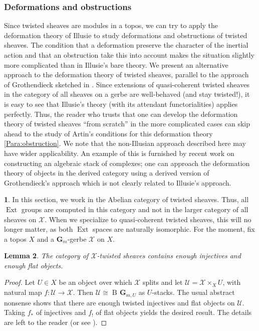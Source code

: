 \documentclass[11pt]{amsart}
\newcommand{\field}[1]{\mathbf #1}
\newcommand{\ms}[1]{\mathscr #1}
\newcommand{\G}{\field G} %
\DeclareMathOperator{\ext}{\operatorname{Ext}}
\renewcommand{\[}{[\!\hspace{0.03em}[}
\renewcommand{\]}{]\!\hspace{0.03em}]}
\renewcommand{\(}{(\!\hspace{0.03em}(}
\renewcommand{\)}{)\!\hspace{0.03em})}
\DeclareMathOperator{\B}{\operatorname{B\!}}
\newtheorem{lem}{Lemma}[subsubsection]%
\theoremstyle{definition}
\newtheorem{para}[lem]{\indent}
\theoremstyle{remark}
\begin{document}
\subsubsection{Deformations and obstructions}\label{S:deformations of twisted sheaves}
Since twisted sheaves are modules in a topos, we can try to apply the deformation theory of 
Illusie to study deformations and obstructions of twisted sheaves.  The condition that 
a deformation preserve the character of the inertial action and that an 
obstruction take this into account makes the situation slightly more 
complicated than in Illusie's bare theory.  We present an alternative 
approach 
to the deformation theory of twisted sheaves, parallel to the 
approach of Grothendieck sketched in \cite{illusie}.  Since extensions of quasi-coherent twisted sheaves in the 
category of all sheaves on a gerbe are well-behaved (and stay 
twisted!), it is easy to see that Illusie's theory (with its attendant 
functorialities) applies perfectly.  Thus, the reader who trusts that 
one can develop the deformation theory of twisted sheaves ``from 
scratch'' in the more complicated cases can skip ahead to the study 
of Artin's conditions for this deformation theory 
\ref{Para:obstruction}.  We note that the non-Illusian approach 
described here may have wider applicability.  An example of this is 
furnished by recent work \cite{moduli-complexes} on constructing an algebraic 
stack of complexes; one can approach the deformation theory of 
objects in the derived category using a derived version of 
Grothendieck's approach which is not clearly related to Illusie's 
approach.

\begin{para} In this 
section, we work in the Abelian category of twisted sheaves.  Thus, 
all $\ext$ groups are computed in this category and not in the larger 
category of all sheaves on $\ms X$.  When we specialize to 
quasi-coherent twisted sheaves, this will no longer matter, as both 
$\ext$ spaces are naturally isomorphic.  For the moment, fix a topos 
$X$ and a $\G_{m}$-gerbe $\ms X$ on $X$.
\end{para}
\begin{lem}\label{L:enough of everything} The category of $\ms X$-twisted sheaves contains enough 
injectives and enough flat objects.
\end{lem}
\begin{proof} Let $U\in X$ be an object over which $\ms X$ splits and 
let $\ms U=\ms X\times_{X}U$, with natural map $f:\ms U\to\ms X$.  
Then $\ms U\cong\B{\G_{m,U}}$ as $U$-stacks.  The usual abstract 
nonsense shows that there are enough twisted injectives and flat objects on $\ms 
U$.  Taking $f_{\ast}$ of injectives and $f_{!}$ of flat objects 
yields the desired result.  The details are left to the reader (or see 
\cite{caldararu}).
\end{proof}
\end{document}

